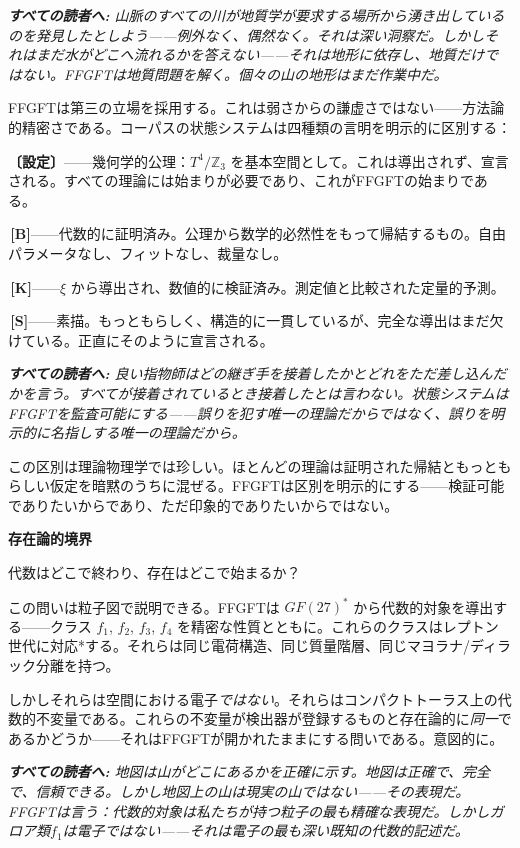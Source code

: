 \documentclass[11pt,openany]{book}
\newcommand{\status}[1]{\penalty10000\,{\tiny\textcolor{gray!70}{[#1]}}}
\newenvironment{laierspur}{%
  \par\vspace{4pt}%
  \noindent\small\itshape\color{blue!60!black}%
  \textbf{すべての読者へ:}\enspace\ignorespaces}{%
  \par\vspace{4pt}\normalsize\normalfont\normalcolor}
\begin{document}
\begin{laierspur}
山脈のすべての川が地質学が要求する場所から湧き出しているのを発見したとしよう——例外なく、偶然なく。それは深い洞察だ。しかしそれはまだ水がどこへ流れるかを答えない——それは地形に依存し、地質だけではない。FFGFTは地質問題を解く。個々の山の地形はまだ作業中だ。
\end{laierspur}

FFGFTは第三の立場を採用する。これは弱さからの謙虚さではない——方法論的精密さである。コーパスの状態システムは四種類の言明を明示的に区別する：

\textbf{〔設定〕}——幾何学的公理：$T^4/\mathbb{Z}_3$ を基本空間として。これは導出されず、宣言される。すべての理論には始まりが必要であり、これがFFGFTの始まりである。

\textbf{\status{B}}——代数的に証明済み。公理から数学的必然性をもって帰結するもの。自由パラメータなし、フィットなし、裁量なし。

\textbf{\status{K}}——$\xi$ から導出され、数値的に検証済み。測定値と比較された定量的予測。

\textbf{\status{S}}——素描。もっともらしく、構造的に一貫しているが、完全な導出はまだ欠けている。正直にそのように宣言される。

\begin{laierspur}
良い指物師はどの継ぎ手を接着したかとどれをただ差し込んだかを言う。すべてが接着されているとき接着したとは言わない。状態システムはFFGFTを監査可能にする——誤りを犯す唯一の理論だからではなく、誤りを明示的に名指しする唯一の理論だから。
\end{laierspur}

この区別は理論物理学では珍しい。ほとんどの理論は証明された帰結ともっともらしい仮定を暗黙のうちに混ぜる。FFGFTは区別を明示的にする——検証可能でありたいからであり、ただ印象的でありたいからではない。

\textbf{存在論的境界}

代数はどこで終わり、存在はどこで始まるか？

この問いは粒子図で説明できる。FFGFTは $GF(27)^*$ から代数的対象を導出する——クラス {$f_1$, $f_2$, $f_3$, $f_4$} を精密な性質とともに。これらのクラスはレプトン世代に対応*する。それらは同じ電荷構造、同じ質量階層、同じマヨラナ/ディラック分離を持つ。

しかしそれらは空間における電子\textit{ではない}。それらはコンパクトトーラス上の代数的不変量である。これらの不変量が検出器が登録するものと存在論的に\textit{同一}であるかどうか——それはFFGFTが開かれたままにする問いである。意図的に。

\begin{laierspur}
地図は山がどこにあるかを正確に示す。地図は正確で、完全で、信頼できる。しかし地図上の山は現実の山ではない——その表現だ。FFGFTは言う：代数的対象は私たちが持つ粒子の最も精確な表現だ。しかしガロア類$f_1$は電子ではない——それは電子の最も深い既知の代数的記述だ。
\end{laierspur}
\end{document}
